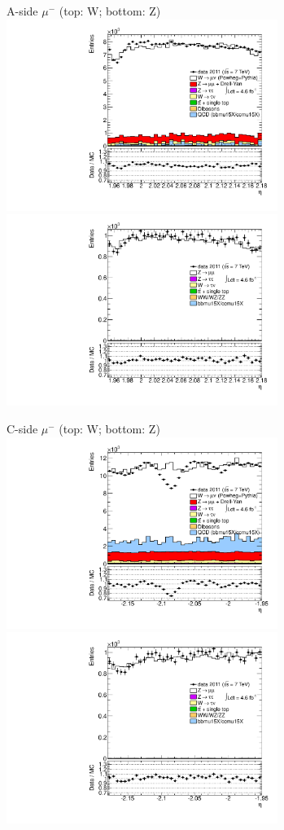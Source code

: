 {{
A-side $\mu^{-}$ (top: W; bottom: Z)
\centering
\includegraphics[width=0.66\textwidth]{dates/20130306/figures/etaphi/W_10_A_stack_l_eta_NEG} \\
\includegraphics[width=0.66\textwidth]{dates/20130306/figures/etaphi/Z_10_A_stack_lN_eta_ALL.pdf} 

\cole
}


 {
\colb[T]

C-side $\mu^{-}$ (top: W; bottom: Z)
\centering
\includegraphics[width=0.66\textwidth]{dates/20130306/figures/etaphi/Wnometmt_10_C_stack_l_eta_NEG} \\
\includegraphics[width=0.66\textwidth]{dates/20130306/figures/etaphi/Z_10_C_stack_lN_eta_ALL.pdf}

}}
